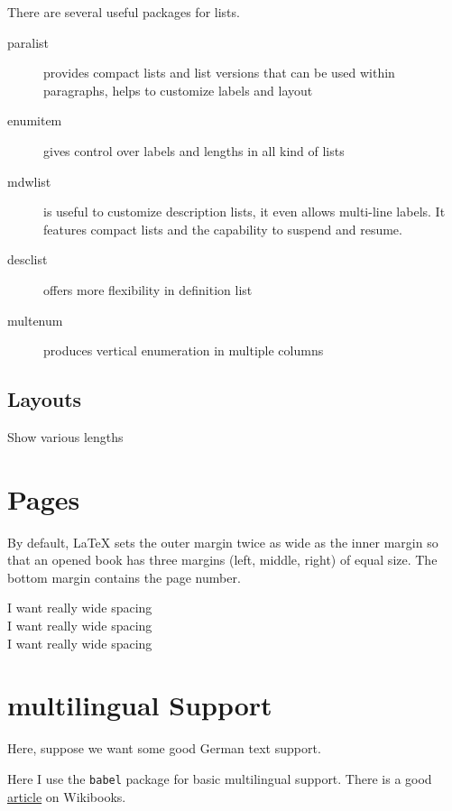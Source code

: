\documentclass[a4paper,12pt]{article}
\newcommand{\code}[1]{\texttt{#1}}
\begin{document}
There are several useful packages for lists.

\begin{description}
  \item[paralist] provides compact lists and list versions that
can be used within paragraphs, helps to customize labels and
layout
\item[enumitem] gives control over labels and lengths
in all kind of lists
\item[mdwlist] is useful to customize description lists, it
even allows multi-line labels. It features compact lists and
the capability to suspend and resume.
\item[desclist] offers more flexibility in definition list
\item[multenum] produces vertical enumeration in multiple
columns
\end{description}

\subsection{Layouts}

Show various lengths

\listdiagram

\section{Pages}

By default, LaTeX sets the outer margin twice as wide as the inner margin so that an opened book has three margins (left, middle, right) of equal size. The bottom margin contains the page number.

\begin{spacing}{2.4}
\noindent I want really wide spacing \\
I want really wide spacing \\
I want really wide spacing \\
\end{spacing}

\section{multilingual Support}

Here, suppose we want some good German text support.

Here I use the \code{babel} package for basic multilingual support. There is a good \href{https://en.wikibooks.org/wiki/LaTeX/Internationalization}{article}
on Wikibooks.
\end{document}
